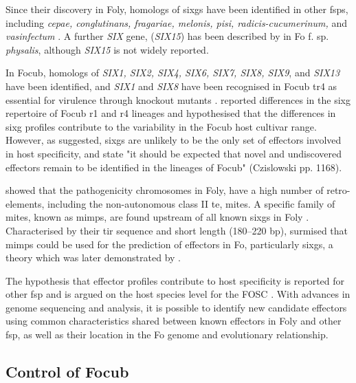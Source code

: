 Since their discovery in \ac{Foly}, homologs of \acp{sixg} have been identified in other \acp{fsp}, including \textit{cepae, conglutinans, fragariae, melonis, pisi, radicis-cucumerinum,} and \textit{vasinfectum} \parencite{Czislowski2018}. A further \textit{SIX} gene, (\textit{SIX15}) has been described by \textcite{Simbaqueba2018} in \acl{Fo} f. sp. \textit{physalis}, although \textit{SIX15} is not widely reported. 

In \ac{Focub}, homologs of \textit{SIX1, SIX2, SIX4, SIX6, SIX7, SIX8, SIX9}, and \textit{SIX13} have been identified, and \textit{SIX1} and \textit{SIX8} have been recognised in \ac{Focub} \ac{tr4} as essential for virulence through knockout mutants \parencite{ Widinugraheni2018, An2019}. \textcite{Czislowski2018} reported differences in the \ac{sixg} repertoire of \ac{Focub} \ac{r1} and \ac{r4} lineages and hypothesised that the differences in \ac{sixg} profiles contribute to the variability in the \ac{Focub} host cultivar range.  However, as suggested, \acp{sixg} are unlikely to be the only set of effectors involved in host specificity, and state "it should be expected that novel and undiscovered effectors remain to be identified in the lineages of \ac{Focub}" (Czislowski  pp. 1168).  

\textcite{Ma2010} showed that the pathogenicity chromosomes in \ac{Foly}, have a high number of retro-elements, including the non-autonomous class II \ac{te}, \ac{mites}. A specific family of \ac{mites}, known as \acp{mimp}, are found upstream of all known \acp{sixg} in \ac{Foly} \parencite{Schmidt2013}. Characterised by their \ac{tir} sequence and short length (180–220 \acs{bp}), \textcite{Schmidt2013} surmised that \acp{mimp} could be used for the prediction of effectors in \ac{Fo}, particularly \acp{sixg}, a theory which was later demonstrated by \textcite{Dam2016, Dam2017, Armitage2018, FoEC2}.  

The hypothesis that effector profiles contribute to host specificity is reported for other \ac{fsp} \parencite{Achari2021, Batson2021} and is argued on the host species level for the \ac{FOSC} \parencite{Dam2016}. With advances in genome sequencing and analysis, it is possible to identify new candidate effectors using common characteristics shared between known effectors in \ac{Foly} and other \ac{fsp}, as well as their location in the \ac{Fo} genome and evolutionary relationship.

\subsection{Control of \acl{Focub}}

